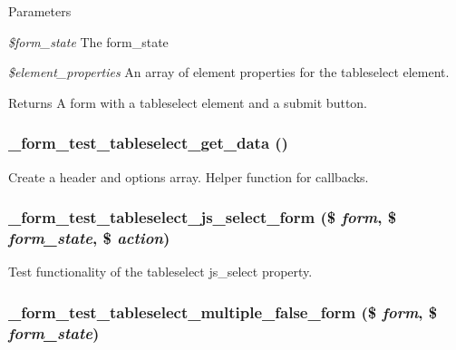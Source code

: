 \begin{DoxyParams}{Parameters}
\item[{\em \$form\_\-state}]The form\_\-state \item[{\em \$element\_\-properties}]An array of element properties for the tableselect element.\end{DoxyParams}
\begin{DoxyReturn}{Returns}
A form with a tableselect element and a submit button. 
\end{DoxyReturn}
\hypertarget{form__test_8module_a3097de1a18ae18625f8d12dfc40d69cf}{
\subsubsection[{\_\-form\_\-test\_\-tableselect\_\-get\_\-data}]{\setlength{\rightskip}{0pt plus 5cm}\_\-form\_\-test\_\-tableselect\_\-get\_\-data ()}}
\label{form__test_8module_a3097de1a18ae18625f8d12dfc40d69cf}
Create a header and options array. Helper function for callbacks. \hypertarget{form__test_8module_a6054e25ea471f1c75ad64e0fc717be75}{
\subsubsection[{\_\-form\_\-test\_\-tableselect\_\-js\_\-select\_\-form}]{\setlength{\rightskip}{0pt plus 5cm}\_\-form\_\-test\_\-tableselect\_\-js\_\-select\_\-form (\$ {\em form}, \/  \$ {\em form\_\-state}, \/  \$ {\em action})}}
\label{form__test_8module_a6054e25ea471f1c75ad64e0fc717be75}
Test functionality of the tableselect js\_\-select property. \hypertarget{form__test_8module_a00d49c26360bc56984b503ba44417d1a}{
\subsubsection[{\_\-form\_\-test\_\-tableselect\_\-multiple\_\-false\_\-form}]{\setlength{\rightskip}{0pt plus 5cm}\_\-form\_\-test\_\-tableselect\_\-multiple\_\-false\_\-form (\$ {\em form}, \/  \$ {\em form\_\-state})}}
